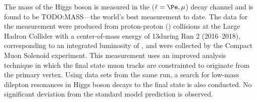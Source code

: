% 

The mass of the Higgs boson is measured in the \hzzfourl
($\ell = \Pe, \mu$) %
decay channel and is found to be TODO:MASS---the world's best measurement to date. 
The data for the measurement were produced from proton-proton (\pp) collisions at the Large Hadron Collider with a center-of-mass energy of 13\TeV during Run 2 (2016--2018), corresponding to an integrated luminosity of \lumiruntwo, and were collected by the Compact Muon Solenoid experiment.
This measurement uses an improved analysis technique in which the final state muon tracks are constrainted to originate from the primary \pp vertex.
Using data sets from the same run, a search for low-mass dilepton resonances in Higgs boson decays to the \fourl final state is also conducted.
No significant deviation from the standard model prediction is observed.

